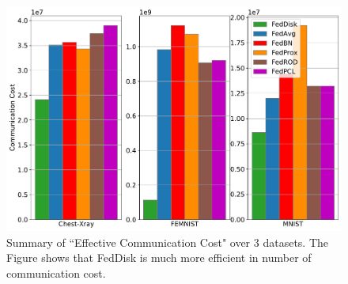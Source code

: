 \documentclass[journal]{IEEEtai}
\newcommand{\MethodnameShort}{FedDisk}
\begin{document}
\begin{figure}[ht!]
	\centering
	\includegraphics[width=0.7\linewidth]{Figures/Com.Cost}
	\caption{Summary of ``Effective Communication Cost" over 3 datasets. The Figure shows that \MethodnameShort{} is much more efficient in number of communication cost.}	
	\label{fig:communication_cost}
\end{figure}
\end{document}
